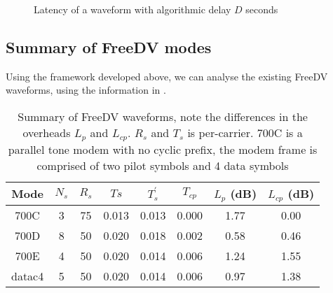 \documentclass{article}
\begin{document}
\begin{figure}[h]
\caption{Latency of a waveform with algorithmic delay $D$ seconds}
\vspace{5mm}
\label{fig:latency}
\centering
{}
\end{figure}

\subsection{Summary of FreeDV modes}

Using the framework developed above, we can analyse the existing FreeDV waveforms, using the information in \cite{codec2_waveform_spreadsheet}.

\begin{table}[h]
\label{tab:freedv_wavefoms}
\centering
\begin{tabular}{c c c c c c c c}
 \hline
 Mode & $N_s$ & $R_s$ & $Ts$ & $T^\prime_s$ & $T_{cp}$ & ${L_p}$ (dB) & $L_{cp}$ (dB)  \\
 \hline
 700C & 3 & 75 & 0.013 & 0.013 & 0.000 & 1.77 & 0.00 \\
 700D & 8 & 50 & 0.020 & 0.018 & 0.002 & 0.58 & 0.46 \\
 700E & 4 & 50 & 0.020 & 0.014 & 0.006 & 1.24 & 1.55 \\
 datac4 & 5 & 50 & 0.020 & 0.014 & 0.006 & 0.97 & 1.38 \\
 \hline
\end{tabular}
\caption{Summary of FreeDV waveforms, note the differences in the overheads $L_p$ and $L_{cp}$. $R_s$ and $T_s$ is per-carrier. 700C is a parallel tone modem with no cyclic prefix, the modem frame is comprised of two pilot symbols and 4 data symbols}
\end{table}
\end{document}
